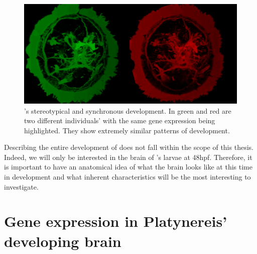 \begin{figure}[bth]
  \includegraphics[width=\linewidth]{gfx/chapter1/brain_comparison.png}
  \caption{\platyfull{}'s stereotypical and synchronous development. In green and red are two different \platy{} individuals' with the same gene expression being highlighted. They show extremely similar patterns of development.}
  \label{fig:brain_comparison}
\end{figure}

	 Describing the entire development of \platy{} does not fall within the scope of this thesis. Indeed, we will only be interested in the brain of \platy{}'s larvae at 48hpf. Therefore, it is important to have an anatomical idea of what the brain looks like at this time in development and what inherent characteristics will be the most interesting to investigate.

\section{Gene expression in Platynereis' developing brain}
